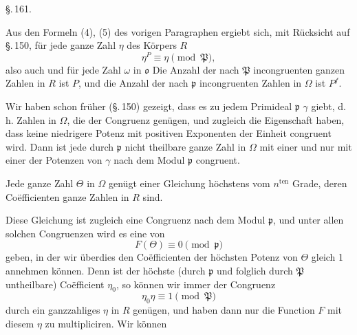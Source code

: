 \begin{center}
\S.\,161.\\[4pt]
\end{center}

Aus den Formeln (4), (5) des vorigen Paragraphen ergiebt sich, mit Rücksicht auf \S.\,150, für jede ganze Zahl $\eta$ des Körpers $R$
\[
\eta^P \equiv \eta \pmod{\mathfrak{P}},
\]
also auch
und für jede Zahl $\omega$ in $\mathfrak{o}$
Die Anzahl der nach $\mathfrak{P}$ incongruenten ganzen Zahlen in $R$ ist $P$, und die Anzahl der nach $\mathfrak{p}$ incongruenten Zahlen in $\Omega$ ist $P^f$.

Wir haben schon früher (\S.\,150) gezeigt, dass es zu jedem Primideal $\mathfrak{p}$  $\gamma$ giebt, d. h. Zahlen in $\Omega$, die der Congruenz
genügen, und zugleich die Eigenschaft haben, dass keine niedrigere Potenz mit positiven Exponenten der Einheit congruent wird. Dann ist jede durch $\mathfrak{p}$ nicht theilbare ganze Zahl in $\Omega$ mit einer und nur mit einer der Potenzen von $\gamma$
nach dem Modul $\mathfrak{p}$ congruent.

Jede ganze Zahl $\Theta$ in $\Omega$ genügt einer Gleichung höchstens vom $n^{\text{ten}}$ Grade, deren Coëfficienten ganze Zahlen in $R$ sind.

Diese Gleichung ist zugleich eine Congruenz nach dem Modul $\mathfrak{p}$, und unter allen solchen Congruenzen wird es eine von 
\[
F(\Theta) \equiv 0 \pmod{\mathfrak{p}}
\]
geben, in der wir überdies den Coëfficienten der höchsten Potenz von $\Theta$ gleich 1 annehmen können. Denn ist der höchste (durch $\mathfrak{p}$ und folglich durch $\mathfrak{P}$ untheilbare) Coëfficient $\eta_0$, so können wir immer der Congruenz
\[
\eta_0 \eta \equiv 1 \pmod{\mathfrak{P}}
\]
durch ein ganzzahliges $\eta$ in $R$ genügen, und haben dann nur die Function $F$ mit diesem $\eta$ zu multipliciren. Wir können
